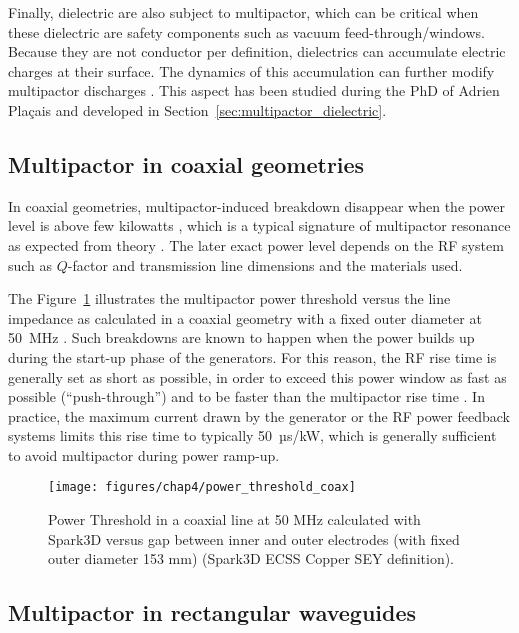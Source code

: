 Finally, dielectric are also subject to multipactor, which can be critical when these dielectric are safety components such as vacuum feed-through/windows. Because they are not conductor per definition, dielectrics can accumulate electric charges at their surface. The dynamics of this accumulation can further modify multipactor discharges . This aspect has been studied during the PhD of Adrien Plaçais  and developed in Section~\ref{sec:multipactor_dielectric}.


\subsection{Multipactor in coaxial geometries}\label{sec:multipactor_icrf}
In coaxial geometries, multipactor-induced breakdown disappear when the power level is above few kilowatts , which is a typical signature of multipactor resonance as expected from theory  . The later exact power level depends on the RF system such as $Q$-factor and transmission line dimensions and the materials used.  

The Figure~\ref{fig:powerthresholdcoax} illustrates the multipactor power threshold versus the line impedance as calculated in a coaxial geometry with a fixed outer diameter at 50~MHz . Such breakdowns are known to happen when the power builds up during the start-up phase of the generators. For this reason, the RF rise time is generally set as short as possible, in order to exceed this power window as fast as possible (“push-through”) and to be faster than the multipactor rise time . In practice, the maximum current drawn by the generator or the RF power feedback systems limits this rise time to typically 50~µs/kW, which is generally sufficient to avoid multipactor during power ramp-up. 

\begin{figure}[h]
	\centering
	\texttt{[image: figures/chap4/power\_threshold\_coax]}
	\caption{Power Threshold in a coaxial line at 50 MHz calculated with Spark3D versus gap between inner and outer electrodes (with fixed outer diameter 153 mm) (Spark3D ECSS Copper SEY definition).}
	\label{fig:powerthresholdcoax}
\end{figure}




\subsection{Multipactor in rectangular waveguides}\label{sec:multipactor_lhrf}

